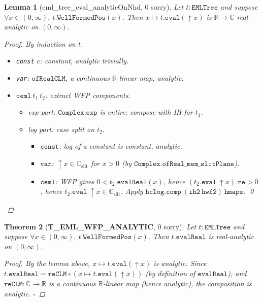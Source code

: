 \documentclass[12pt]{article}
\newtheorem{theorem}{Theorem}
\newtheorem{lemma}[theorem]{Lemma}
\begin{document}
\begin{lemma}[eml\_tree\_eval\_analyticOnNhd, 0 sorry]
Let $t : \mathtt{EMLTree}$ and suppose
$\forall x \in (0,\infty),\ t.\mathtt{WellFormedPos}(x)$.
Then $x \mapsto t.\mathtt{eval}(\uparrow\!x)$ is $\mathbb{R} \to \mathbb{C}$ real-analytic
on $(0,\infty)$.

\begin{proof}
By induction on $t$.
\begin{itemize}[noitemsep]
  \item \texttt{const} $c$: constant, analytic trivially.
  \item \texttt{var}: $\mathtt{ofRealCLM}$, a continuous $\mathbb{R}$-linear map, analytic.
  \item $\mathtt{ceml}\ t_1\ t_2$: extract WFP components.
    \begin{itemize}[noitemsep]
      \item \emph{exp part}: $\mathtt{Complex.exp}$ is entire; compose with IH for $t_1$.
      \item \emph{log part}: case split on $t_2$.
        \begin{itemize}[noitemsep]
          \item $\mathtt{const}$: log of a constant is constant, analytic.
          \item $\mathtt{var}$: $\uparrow\!x \in \mathbb{C}_{\mathrm{slit}}$ for $x > 0$
            (by $\mathtt{Complex.ofReal\_mem\_slitPlane}$).
          \item $\mathtt{ceml}$: WFP gives $0 < t_2.\mathtt{evalReal}(x)$,
            hence $(t_2.\mathtt{eval}\ \uparrow\!x).\mathtt{re} > 0$,
            hence $t_2.\mathtt{eval}\ \uparrow\!x \in \mathbb{C}_{\mathrm{slit}}$.
            Apply $\mathtt{hclog.comp}\ (\mathtt{ih2}\ \mathtt{hwf2})\ \mathtt{hmaps}$. \qed
        \end{itemize}
    \end{itemize}
\end{itemize}
\end{proof}
\end{lemma}

\begin{theorem}[\textbf{T\_EML\_WFP\_ANALYTIC}, 0 sorry]\label{thm:main}
Let $t : \mathtt{EMLTree}$ and suppose
$\forall x \in (0,\infty),\ t.\mathtt{WellFormedPos}(x)$.
Then $t.\mathtt{evalReal}$ is real-analytic on $(0,\infty)$.

\begin{proof}
By the lemma above, $x \mapsto t.\mathtt{eval}(\uparrow\!x)$ is analytic.
Since $t.\mathtt{evalReal} = \mathtt{reCLM} \circ (x \mapsto t.\mathtt{eval}(\uparrow\!x))$
(by definition of $\mathtt{evalReal}$), and $\mathtt{reCLM} : \mathbb{C} \to \mathbb{R}$
is a continuous $\mathbb{R}$-linear map (hence analytic), the composition is analytic. $\square$
\end{proof}
\end{theorem}
\end{document}
